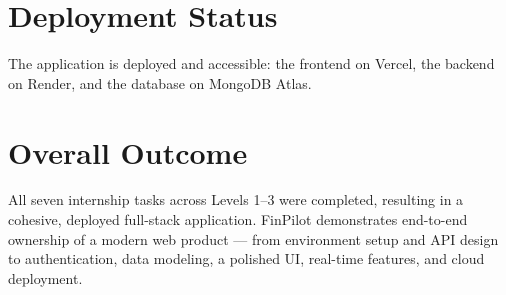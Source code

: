 \documentclass[11pt,a4paper]{report}
\begin{document}
\section{Deployment Status}
The application is deployed and accessible: the frontend on Vercel, the backend
on Render, and the database on MongoDB Atlas.

\section{Overall Outcome}
All seven internship tasks across Levels 1--3 were completed, resulting in a
cohesive, deployed full-stack application. FinPilot demonstrates end-to-end
ownership of a modern web product --- from environment setup and API design to
authentication, data modeling, a polished UI, real-time features, and cloud
deployment.
\end{document}
